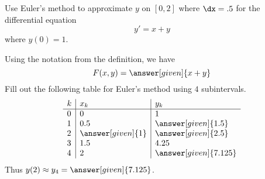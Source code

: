 \documentclass{ximera}
\begin{document}
\begin{example}
Use Euler's method to approximate $y$ on $[0,2]$ where $\dx = .5$ for
the differential equation
\[
y'=x+y
\]
where $y(0) = 1$.
\begin{explanation}
Using the notation from the definition, we have
\[
F(x,y) = \answer[given]{x+y}
\]
Fill out the following table for Euler's method using $4$
subintervals.
\[
\begin{array}{l|l|l}
  k & x_k & y_k \\ \hline
  0 & 0   & 1 \\
  1 & 0.5 & \answer[given]{1.5} \\
  2 & \answer[given]{1} & \answer[given]{2.5}  \\
  3 & 1.5 & 4.25 \\
  4 & 2 & \answer[given]{7.125}
\end{array}
\]
Thus $y(2) \approx y_4 =\answer[given]{7.125}$.
\end{explanation}
\end{example}
\end{document}
